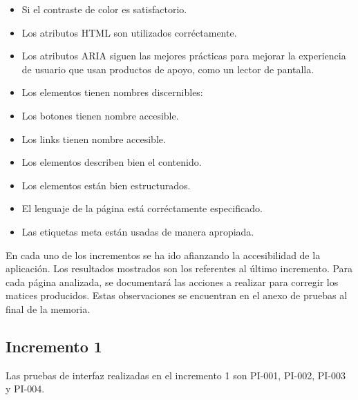 \begin{itemize}
\begin{itemize}
\item Si el contraste de color es satisfactorio.
\item Los atributos HTML son utilizados corréctamente.
\item Los atributos ARIA siguen las mejores prácticas para mejorar la experiencia de usuario que usan productos de apoyo, como un lector de pantalla.
\item Los elementos tienen nombres discernibles:
\item Los botones tienen nombre accesible.
\item Los links tienen nombre accesible.
\item Los elementos describen bien el contenido.
\item Los elementos están bien estructurados.
\item El lenguaje de la página está corréctamente especificado.
\item Las etiquetas meta están usadas de manera apropiada.
\end{itemize}


En cada uno de los incrementos se ha ido afianzando la accesibilidad de la aplicación. Los resultados mostrados son los referentes al último incremento. Para cada página analizada, se documentará las acciones a realizar para corregir los matices producidos. Estas observaciones se encuentran en el anexo de pruebas al final de la memoria.
\end{itemize}


\subsection{Incremento 1}

Las pruebas de interfaz realizadas en el incremento 1 son PI-001, PI-002, PI-003 y PI-004.


